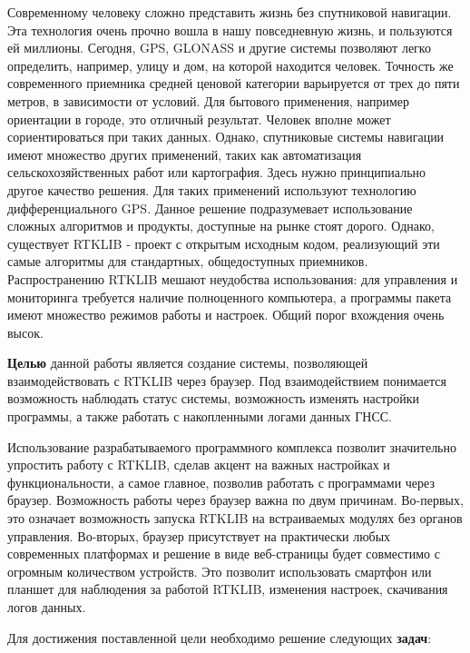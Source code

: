 \intro

Современному человеку сложно представить жизнь без спутниковой навигации. Эта технология очень прочно вошла в нашу повседневную жизнь, и пользуются ей миллионы. Сегодня, GPS, GLONASS и другие системы позволяют легко определить, например, улицу и дом, на которой находится человек. Точность же современного приемника средней ценовой категории варьируется от трех до пяти метров, в зависимости от условий. Для бытового применения, например ориентации в городе, это отличный результат. Человек вполне может сориентироваться при таких данных. Однако, спутниковые системы навигации имеют множество других применений, таких как автоматизация сельскохозяйственных работ или картография. Здесь нужно принципиально другое качество решения. Для таких применений используют технологию дифференциального GPS. Данное решение подразумевает использование сложных алгоритмов и продукты, доступные на рынке стоят дорого. Однако, существует RTKLIB - проект с открытым исходным кодом, реализующий эти самые алгоритмы для стандартных, общедоступных приемников. Распространению RTKLIB мешают неудобства использования: для управления и мониторинга требуется наличие полноценного компьютера, а программы пакета имеют множество режимов работы и настроек. Общий порог вхождения очень высок.

\textbf{Целью} данной работы является создание системы, позволяющей взаимодействовать с RTKLIB через браузер. Под взаимодействием понимается возможность наблюдать статус системы, возможность изменять настройки программы, а также работать с накопленными логами данных ГНСС.

Использование разрабатываемого программного комплекса позволит значительно упростить работу с RTKLIB, сделав акцент на важных настройках и функциональности, а самое главное, позволив работать с программами через браузер. Возможность работы через браузер важна по двум причинам. Во-первых, это означает возможность запуска RTKLIB на встраиваемых модулях без органов управления. Во-вторых, браузер присутствует на практически любых современных платформах и решение в виде веб-страницы будет совместимо с огромным количеством устройств. Это позволит использовать смартфон или планшет для наблюдения за работой RTKLIB, изменения настроек, скачивания логов данных.

Для достижения поставленной цели необходимо решение следующих \textbf{задач}:


